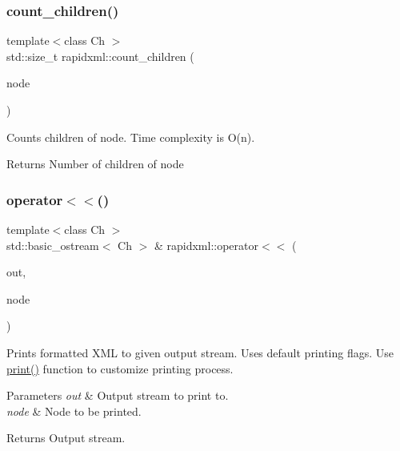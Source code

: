 \subsubsection{\texorpdfstring{count\+\_\+children()}{count\_children()}}
{\footnotesize\ttfamily template$<$class Ch $>$ \\
std\+::size\+\_\+t rapidxml\+::count\+\_\+children (\begin{DoxyParamCaption}\item[{\mbox{\hyperlink{classrapidxml_1_1xml__node}{xml\+\_\+node}}$<$ Ch $>$ $\ast$}]{node }\end{DoxyParamCaption})\hspace{0.3cm}{\ttfamily [inline]}}

Counts children of node. Time complexity is O(n). \begin{DoxyReturn}{Returns}
Number of children of node 
\end{DoxyReturn}
\mbox{\label{namespacerapidxml_abe7a33b812232c168620d6c1548cac3c}} 
\subsubsection{\texorpdfstring{operator$<$$<$()}{operator<<()}}
{\footnotesize\ttfamily template$<$class Ch $>$ \\
std\+::basic\+\_\+ostream$<$ Ch $>$ \& rapidxml\+::operator$<$$<$ (\begin{DoxyParamCaption}\item[{std\+::basic\+\_\+ostream$<$ Ch $>$ \&}]{out,  }\item[{const \mbox{\hyperlink{classrapidxml_1_1xml__node}{xml\+\_\+node}}$<$ Ch $>$ \&}]{node }\end{DoxyParamCaption})\hspace{0.3cm}{\ttfamily [inline]}}

Prints formatted X\+ML to given output stream. Uses default printing flags. Use \mbox{\hyperlink{namespacerapidxml_a0fb0be6eba49fb2e2646d5a72a0dc355}{print()}} function to customize printing process. 
\begin{DoxyParams}{Parameters}
{\em out} & Output stream to print to. \\
\hline
{\em node} & Node to be printed. \\
\hline
\end{DoxyParams}
\begin{DoxyReturn}{Returns}
Output stream. 
\end{DoxyReturn}
\mbox{\label{namespacerapidxml_a0fb0be6eba49fb2e2646d5a72a0dc355}} 
